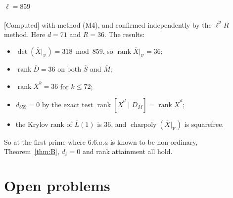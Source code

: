 \documentclass[11pt]{amsart}
\newcommand{\Sb}{\overline{S}}
\newcommand{\Mb}{\overline{M}}
\newcommand{\Db}{\overline{D}}
\newcommand{\Xb}{\overline{X}}
\newcommand{\Lb}{\overline{L}}
\newcommand{\cV}{\mathcal{V}}
\DeclareMathOperator{\rank}{rank}
\DeclareMathOperator{\charpoly}{charpoly}
\newcommand{\st}[1]{\textup{\textsf{[#1]}}}
\theoremstyle{plain}
\theoremstyle{definition}
\numberwithin{equation}{section}
\begin{document}
\paragraph{$\ell=859$} \st{Computed} with method (M4), and confirmed independently by the $\ell^2R$ method. Here $d=71$ and $R=36$.
The results:
\begin{itemize}
\item $\det(\Xb|_\cV)=318\bmod859$, so $\rank\Xb|_\cV=36$;
\item $\rank\Db=36$ on both $\Sb$ and $\Mb$;
\item $\rank\Xb^k=36$ for $k\le72$;
\item $d_{859}=0$ by the exact test $\rank[\Xb^d\mid\Db_M]=\rank\Xb^d$;
\item the Krylov rank of $\Lb(1)$ is $36$, and $\charpoly(\Xb|_\cV)$ is squarefree.
\end{itemize}
So at the first prime where $6.6.a.a$ is known to be non-ordinary, Theorem~\ref{thm:B}, $d_\ell=0$ and rank attainment all hold.

\section{Open problems}\label{sec:open}
\end{document}

